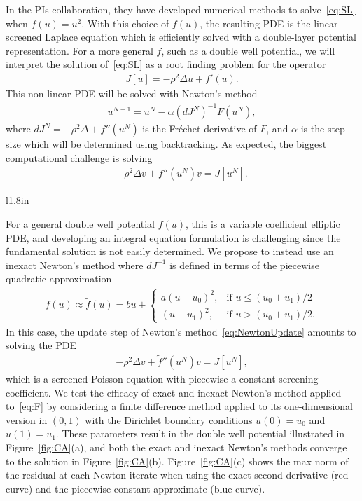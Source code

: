In the PIs collaboration, they have developed numerical methods to
solve~\eqref{eq:SL} when $f(u) = u^2$. With this choice of $f(u)$, the
resulting PDE is the linear screened Laplace equation which is
efficiently solved with a double-layer potential representation. For a
more general $f$, such as a double well potential, we will interpret the
solution of~\eqref{eq:SL} as a root finding problem for the operator
\begin{align}
  \label{eq:F}
  J[u] = -\rho^2 \Delta u + f'(u).
\end{align}
This non-linear PDE will be solved with Newton's method
\begin{align*}
  u^{N+1} = u^{N} - \alpha (dJ^N)^{-1} F(u^N),
\end{align*}
where $dJ^N = -\rho^2 \Delta + f''(u^N)$ is the Fr\'{e}chet derivative
of $F$, and $\alpha$ is the step size which will be determined using
backtracking. As expected, the biggest computational challenge is
solving
\begin{align}
  \label{eq:NewtonUpdate}
  - \rho^2 \Delta v + f''(u^{N}) v = J[u^N].
\end{align}
\begin{wrapfigure}[]{l}{1.8in}
  \vspace{-46pt}
  \centering
   
  \caption{\label{fig:CA} (a) The double well potential $u_0 =
  0.5$, $u_1 = 2$, $a = 1$, $b = 0.4$. (b) The solution of the
  Allen-Cahn equation~\eqref{eq:SL}. (c) The convergence of the exact
  and inexact Newton's methods.}
\end{wrapfigure}
For a general double well potential $f(u)$, this is a variable
coefficient elliptic PDE, and developing an integral equation
formulation is challenging since the fundamental solution is not easily
determined. We propose to instead use an inexact Newton's method where
$dJ^{-1}$ is defined in terms of the piecewise quadratic approximation
\begin{align*}
  f(u) \approx \tilde{f}(u) = bu + \begin{cases}
    a(u - u_0)^2, &\mbox{if } u \leq (u_0 + u_1)/2 \\
    (u - u_1)^2, &\mbox{if } u > (u_0 + u_1)/2.
  \end{cases}
\end{align*}
In this case, the update step of Newton's method~\eqref{eq:NewtonUpdate}
amounts to solving the PDE
\begin{align}
  \label{eq:screenedPoisson}
  -\rho^2 \Delta v + \tilde{f}''(u^{N})v = J[u^N],
\end{align}
which is a screened Poisson equation with piecewise a constant screening
coefficient. We test the efficacy of exact and inexact Newton's method
applied to~\eqref{eq:F} by considering a finite difference method
applied to its one-dimensional version in $(0,1)$ with the Dirichlet
boundary conditions $u(0) = u_0$ and $u(1) = u_1$. These parameters
result in the double well potential illustrated in
Figure~\ref{fig:CA}(a), and both the exact and inexact Newton's methods
converge to the solution in Figure~\ref{fig:CA}(b).
Figure~\ref{fig:CA}(c) shows the max norm of the residual at each Newton
iterate when using the exact second derivative (red curve) and the
piecewise constant approximate (blue curve).

